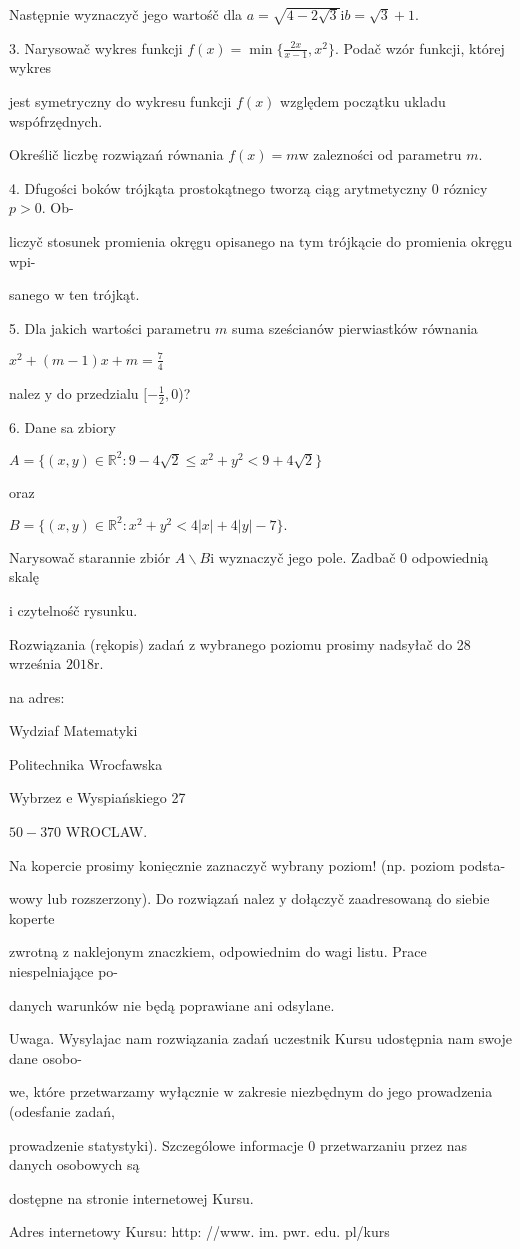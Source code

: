 \documentclass[a4paper,12pt]{article}
\begin{document}
Następnie wyznaczyč jego wartośč dla $a=\sqrt{4-2\sqrt{3}} \mathrm{i} b=\sqrt{3}+1.$

3. Narysowač wykres funkcji $f(x) = \displaystyle \min\{\frac{2x}{x-1},x^{2}\}$. Podač wzór funkcji, której wykres

jest symetryczny do wykresu funkcji $f(x)$ względem początku ukladu wspófrzędnych.

Określič liczbę rozwiązań równania $f(x)=m\mathrm{w}$ zalezności od parametru $m.$

4. Dfugości boków trójkąta prostokątnego tworzą ciąg arytmetyczny $0$ róznicy $p>0$. Ob-

liczyč stosunek promienia okręgu opisanego na $\mathrm{t}\mathrm{y}\mathrm{m}$ trójkącie do promienia okręgu wpi-

sanego $\mathrm{w}$ ten trójkąt.

5. Dla jakich wartości parametru $m$ suma sześcianów pierwiastków równania

$x^{2}+(m-1)x+m=\displaystyle \frac{7}{4}$

nalez $\mathrm{y}$ do przedzialu $[-\displaystyle \frac{1}{2},0$)?

6. Dane sa zbiory

$A=\{(x,y)\in \mathbb{R}^{2}:9-4\sqrt{2}\leq x^{2}+y^{2}<9+4\sqrt{2}\}$

oraz

$B=\{(x,y)\in \mathbb{R}^{2}:x^{2}+y^{2}<4|x|+4|y|-7\}.$

Narysowač starannie zbiór $A\backslash B \mathrm{i}$ wyznaczyč jego pole. Zadbač $0$ odpowiednią skalę

$\mathrm{i}$ czytelnośč rysunku.

Rozwiązania (rękopis) zadań $\mathrm{z}$ wybranego poziomu prosimy nadsyłač do 28 września $2018\mathrm{r}.$

na adres:

Wydziaf Matematyki

Politechnika Wrocfawska

Wybrzez $\mathrm{e}$ Wyspiańskiego 27

$50-370$ WROCLAW.

Na kopercie prosimy $\underline{\mathrm{k}\mathrm{o}\mathrm{n}\mathrm{i}\mathrm{e}\mathrm{c}\mathrm{z}\mathrm{n}\mathrm{i}\mathrm{e}}$ zaznaczyč wybrany poziom! (np. poziom podsta-

wowy lub rozszerzony). Do rozwiązań nalez $\mathrm{y}$ dołączyč zaadresowaną do siebie koperte

zwrotną $\mathrm{z}$ naklejonym znaczkiem, odpowiednim do wagi listu. Prace niespelniające po-

danych warunków nie będą poprawiane ani odsylane.

Uwaga. Wysylajac nam rozwiązania zadań uczestnik Kursu udostępnia nam swoje dane osobo-

we, które przetwarzamy wyłącznie $\mathrm{w}$ zakresie niezbędnym do jego prowadzenia (odesfanie zadań,

prowadzenie statystyki). Szczególowe informacje $0$ przetwarzaniu przez nas danych osobowych są

dostępne na stronie internetowej Kursu.

Adres internetowy Kursu: http: //www. im. pwr. edu. pl/kurs
\end{document}
